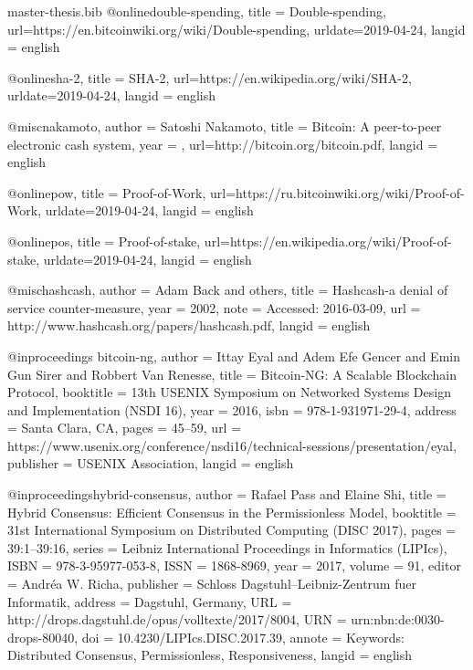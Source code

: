 \begin{filecontents}{master-thesis.bib}
@online{double-spending,
  title = {Double-spending},
  url={https://en.bitcoinwiki.org/wiki/Double-spending},
  urldate={2019-04-24},
  langid = {english}
}

@online{sha-2,
  title = {SHA-2},
  url={https://en.wikipedia.org/wiki/SHA-2},
  urldate={2019-04-24},
  langid = {english}
}

@misc{nakamoto,
    author = {Satoshi Nakamoto},
    title = {Bitcoin: A peer-to-peer electronic cash system},
    year = {},
    url={http://bitcoin.org/bitcoin.pdf},
    langid = {english}
}

@online{pow,
  title = {Proof-of-Work},
  url={https://ru.bitcoinwiki.org/wiki/Proof-of-Work},
  urldate={2019-04-24},
  langid = {english}
}

@online{pos,
  title = {Proof-of-stake},
  url={https://en.wikipedia.org/wiki/Proof-of-stake},
  urldate={2019-04-24},
  langid = {english}
}


@misc{hashcash,
  author = {Adam Back and others},
  title = {Hashcash-a denial of service counter-measure},
  year = {2002},
  note = {Accessed: 2016-03-09},
  url = {http://www.hashcash.org/papers/hashcash.pdf},
  langid = {english}
}

@inproceedings {bitcoin-ng,
  author = {Ittay Eyal and Adem Efe Gencer and Emin Gun Sirer and Robbert Van Renesse},
  title = {Bitcoin-NG: A Scalable Blockchain Protocol},
  booktitle = {13th {USENIX} Symposium on Networked Systems Design and Implementation ({NSDI} 16)},
  year = {2016},
  isbn = {978-1-931971-29-4},
  address = {Santa Clara, CA},
  pages = {45--59},
  url = {https://www.usenix.org/conference/nsdi16/technical-sessions/presentation/eyal},
  publisher = {{USENIX} Association},
  langid = {english}
}

@inproceedings{hybrid-consensus,
  author =	{Rafael Pass and Elaine Shi},
  title =	{{Hybrid Consensus: Efficient Consensus in the Permissionless Model}},
  booktitle =	{31st International Symposium on Distributed Computing (DISC 2017)},
  pages =	{39:1--39:16},
  series =	{Leibniz International Proceedings in Informatics (LIPIcs)},
  ISBN =	{978-3-95977-053-8},
  ISSN =	{1868-8969},
  year =	{2017},
  volume =	{91},
  editor =	{Andr{\'e}a W. Richa},
  publisher =	{Schloss Dagstuhl--Leibniz-Zentrum fuer Informatik},
  address =	{Dagstuhl, Germany},
  URL =		{http://drops.dagstuhl.de/opus/volltexte/2017/8004},
  URN =		{urn:nbn:de:0030-drops-80040},
  doi =		{10.4230/LIPIcs.DISC.2017.39},
  annote =	{Keywords: Distributed Consensus, Permissionless, Responsiveness},
  langid = {english}
}


\end{filecontents}
